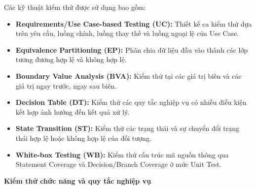 Các kỹ thuật kiểm thử được sử dụng bao gồm:
\begin{itemize}
    \item \textbf{Requirements/Use Case-based Testing (UC):}
    Thiết kế ca kiểm thử dựa trên yêu cầu, luồng chính, 
    luồng thay thế và luồng ngoại lệ của Use Case.

    \item \textbf{Equivalence Partitioning (EP):}
    Phân chia dữ liệu đầu vào thành các lớp tương đương 
    hợp lệ và không hợp lệ.

    \item \textbf{Boundary Value Analysis (BVA):}
    Kiểm thử tại các giá trị biên và các giá trị 
    ngay trước, ngay sau biên.

    \item \textbf{Decision Table (DT):}
    Kiểm thử các quy tắc nghiệp vụ có nhiều điều kiện 
    kết hợp ảnh hưởng đến kết quả xử lý.

    \item \textbf{State Transition (ST):}
    Kiểm thử các trạng thái và sự chuyển đổi trạng thái 
    hợp lệ hoặc không hợp lệ của đối tượng.

    \item \textbf{White-box Testing (WB):}
    Kiểm thử cấu trúc mã nguồn thông qua Statement 
    Coverage và Decision/Branch Coverage ở mức Unit Test.
\end{itemize}

\noindent\textbf{Kiểm thử chức năng và quy tắc nghiệp vụ}



